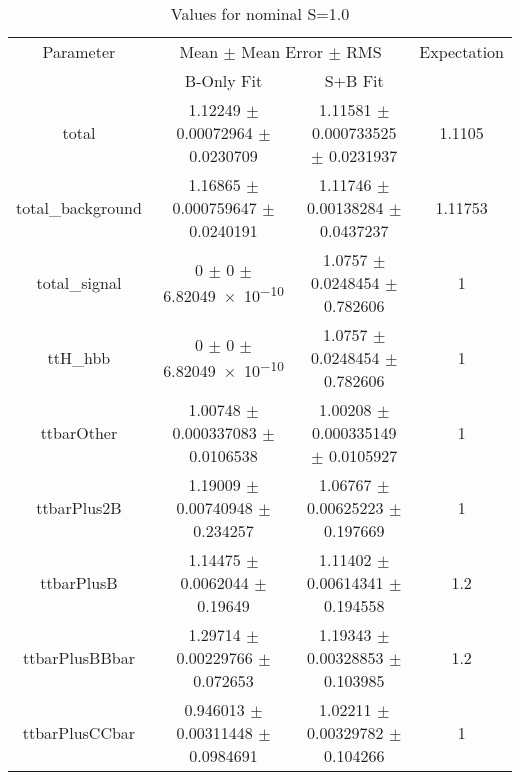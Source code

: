 \begin{table}
\centering
\caption{Values for nominal S=1.0}
\begin{tabular}{cccc}
\toprule
Parameter & \multicolumn{2}{c}{Mean $\pm$ Mean Error $\pm$ RMS} & Expectation\\
 & B-Only Fit & S+B Fit & \\
\midrule
total & \num{1.12249} $\pm$ \num{0.00072964} $\pm$ \num{0.0230709} & \num{1.11581} $\pm$ \num{0.000733525} $\pm$ \num{0.0231937} & \num{1.1105}\\
total\_background & \num{1.16865} $\pm$ \num{0.000759647} $\pm$ \num{0.0240191} & \num{1.11746} $\pm$ \num{0.00138284} $\pm$ \num{0.0437237} & \num{1.11753}\\
total\_signal & \num{0} $\pm$ \num{0} $\pm$ \num{6.82049e-10} & \num{1.0757} $\pm$ \num{0.0248454} $\pm$ \num{0.782606} & \num{1}\\
ttH\_hbb & \num{0} $\pm$ \num{0} $\pm$ \num{6.82049e-10} & \num{1.0757} $\pm$ \num{0.0248454} $\pm$ \num{0.782606} & \num{1}\\
ttbarOther & \num{1.00748} $\pm$ \num{0.000337083} $\pm$ \num{0.0106538} & \num{1.00208} $\pm$ \num{0.000335149} $\pm$ \num{0.0105927} & \num{1}\\
ttbarPlus2B & \num{1.19009} $\pm$ \num{0.00740948} $\pm$ \num{0.234257} & \num{1.06767} $\pm$ \num{0.00625223} $\pm$ \num{0.197669} & \num{1}\\
ttbarPlusB & \num{1.14475} $\pm$ \num{0.0062044} $\pm$ \num{0.19649} & \num{1.11402} $\pm$ \num{0.00614341} $\pm$ \num{0.194558} & \num{1.2}\\
ttbarPlusBBbar & \num{1.29714} $\pm$ \num{0.00229766} $\pm$ \num{0.072653} & \num{1.19343} $\pm$ \num{0.00328853} $\pm$ \num{0.103985} & \num{1.2}\\
ttbarPlusCCbar & \num{0.946013} $\pm$ \num{0.00311448} $\pm$ \num{0.0984691} & \num{1.02211} $\pm$ \num{0.00329782} $\pm$ \num{0.104266} & \num{1}\\
\bottomrule
\end{tabular}
\end{table}